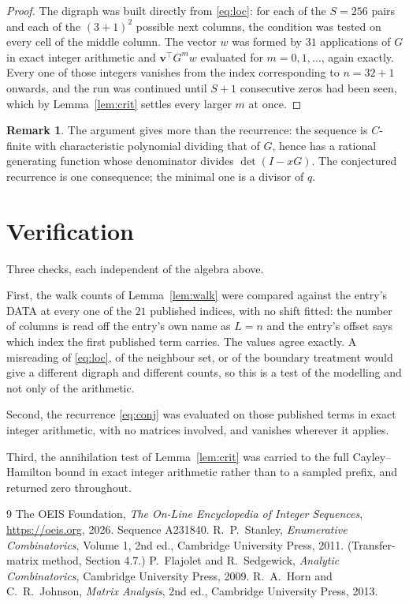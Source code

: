 \documentclass[11pt,a4paper]{article}
\theoremstyle{plain}
\theoremstyle{definition}
\newtheorem{remark}[theorem]{Remark}
\begin{document}
\begin{proof}
The digraph was built directly from \eqref{eq:loc}: for each of the $S=256$ pairs and each
of the $(3+1)^{2}$ possible next columns, the condition was tested on every cell of
the middle column. The vector $w$ was formed by $31$ applications of $G$ in exact integer
arithmetic and $\mathbf{v}^{\!\top}G^{m}w$ evaluated for $m=0,1,\dots$, again exactly.
Every one of those integers vanishes from the index corresponding to $n=32+1$ onwards,
and the run was continued until $S+1$ consecutive zeros had been seen, which by
Lemma~\ref{lem:crit} settles every larger $m$ at once.
\end{proof}

\begin{remark}
The argument gives more than the recurrence: the sequence is $C$-finite with characteristic
polynomial dividing that of $G$, hence has a rational generating function whose denominator
divides $\det(I-xG)$. The conjectured recurrence is one consequence; the minimal one is a
divisor of $q$.
\end{remark}

\section{Verification}

Three checks, each independent of the algebra above.

First, the walk counts of Lemma~\ref{lem:walk} were compared against the entry's DATA at
every one of the $21$ published indices, with no shift fitted: the number of columns is
read off the entry's own name as $L=n$ and the entry's offset says which index the first
published term carries. The values agree exactly. A misreading of \eqref{eq:loc}, of the
neighbour set, or of the boundary treatment would give a different digraph and different
counts, so this is a test of the modelling and not only of the arithmetic.

Second, the recurrence \eqref{eq:conj} was evaluated on those published terms in exact
integer arithmetic, with no matrices involved, and vanishes wherever it applies.

Third, the annihilation test of Lemma~\ref{lem:crit} was carried to the full
Cayley--Hamilton bound in exact integer arithmetic rather than to a sampled prefix, and
returned zero throughout.

\begin{thebibliography}{9}
 The OEIS Foundation, \emph{The On-Line Encyclopedia of Integer
Sequences}, \url{https://oeis.org}, 2026. Sequence A231840.
 R.~P.~Stanley, \emph{Enumerative Combinatorics}, Volume 1, 2nd ed.,
Cambridge University Press, 2011. (Transfer-matrix method, Section 4.7.)
 P.~Flajolet and R.~Sedgewick, \emph{Analytic Combinatorics}, Cambridge
University Press, 2009.
 R.~A.~Horn and C.~R.~Johnson, \emph{Matrix Analysis}, 2nd ed., Cambridge
University Press, 2013.
\end{thebibliography}
\end{document}
